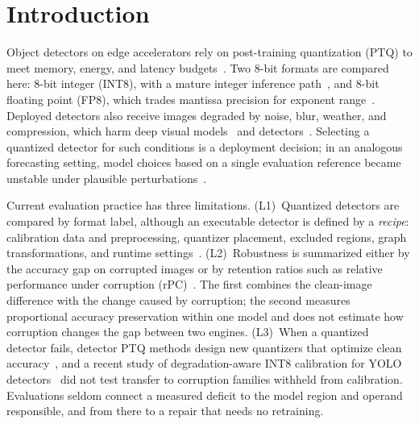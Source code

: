 \documentclass[a4paper,fleqn]{cas-dc}
\begin{document}
\section{Introduction}
\label{sec:introduction}

Object detectors on edge accelerators rely on post-training quantization (PTQ) to meet memory, energy, and latency budgets~\citep{nagel2021whitepaper,gholami2021survey}. Two 8-bit formats are compared here: 8-bit integer (INT8), with a mature integer inference path~\citep{jacob2018integer,yao2021hawqv3,wu2020integer}, and 8-bit floating point (FP8), which trades mantissa precision for exponent range~\citep{micikevicius2022fp8,shen2024fp8}. Deployed detectors also receive images degraded by noise, blur, weather, and compression, which harm deep visual models~\citep{hendrycks2019corruptions,agarwal2024corruptiondepth} and detectors~\citep{michaelis2019detectorrobustness,liu2024realworldcorruptions,yin2025spatialie}. Selecting a quantized detector for such conditions is a deployment decision; in an analogous forecasting setting, model choices based on a single evaluation reference became unstable under plausible perturbations~\citep{semper2026decisionsupport}.

Current evaluation practice has three limitations. (L1)~Quantized detectors are compared by format label, although an executable detector is defined by a \emph{recipe}: calibration data and preprocessing, quantizer placement, excluded regions, graph transformations, and runtime settings~\citep{vanbaalen2023fp8int8}. (L2)~Robustness is summarized either by the accuracy gap on corrupted images or by retention ratios such as relative performance under corruption (rPC)~\citep{michaelis2019detectorrobustness}. The first combines the clean-image difference with the change caused by corruption; the second measures proportional accuracy preservation within one model and does not estimate how corruption changes the gap between two engines. (L3)~When a quantized detector fails, detector PTQ methods design new quantizers that optimize clean accuracy~\citep{niu2023detptq,ding2024regptq,kim2026inlierq}, and a recent study of degradation-aware INT8 calibration for YOLO detectors~\citep{karimov2025robustness} did not test transfer to corruption families withheld from calibration. Evaluations seldom connect a measured deficit to the model region and operand responsible, and from there to a repair that needs no retraining.
\end{document}
